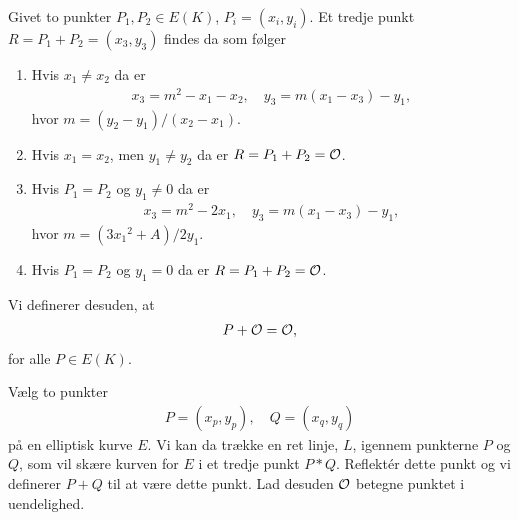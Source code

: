 \begin{definition}
Givet to punkter $P_1, P_2 \in E(K)$, $P_i = (x_i, y_i)$. Et tredje punkt
$R = P_1 + P_2 = (x_3, y_3)$ findes da som følger
\begin{enumerate}
	\item Hvis $x_1 \neq x_2$ da er 
	\begin{align*}
		x_3 = m^2 - x_1 - x_2, \quad y_3 = m(x_1 - x_3) - y_1,
	\end{align*}		
	hvor $m = (y_2 - y_1)/(x_2 - x_1)$.
	\item Hvis $x_1 = x_2$, men $y_1 \neq y_2$ da er $R = P_1 + P_2 = \mathcal{O}$.
	\item Hvis $P_1 = P_2$ og $y_1 \neq 0$ da er 
	\begin{align*}
		x_3 = m^2 - 2x_1, \quad y_3=m(x_1 - x_3) - y_1,
	\end{align*}
	hvor $m=(3{x_1}^2 + A)/2y_1$.
	\item Hvis $P_1 = P_2$ og $y_1 = 0$ da er $R = P_1 + P_2 = \mathcal{O}$.
\end{enumerate}
Vi definerer desuden, at 
\begin{align*}
	P + \mathcal{O} = \mathcal{O},
\end{align*}
for alle $P \in E(K)$.
\end{definition}
Vælg to punkter 
\begin{align*}
	P = (x_p, y_p), \quad Q = (x_q, y_q)
\end{align*}
på en elliptisk kurve $E$. Vi kan da trække en ret linje, $L$, igennem
punkterne $P$ og $Q$, som vil skære kurven for $E$ i et tredje 
punkt $P*Q$. Reflektér dette punkt og vi definerer $P+Q$ til at være
dette punkt. Lad desuden $\mathcal{O}$ betegne punktet i uendelighed. 


